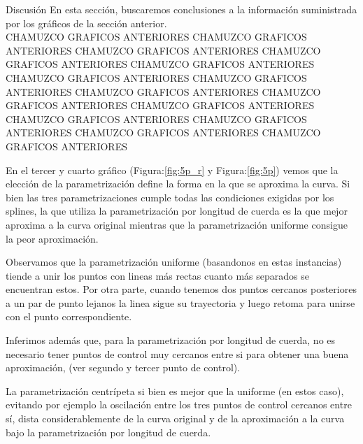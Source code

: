 \begin{section}{Discusión}
	En esta sección, buscaremos conclusiones a la información suministrada por los gráficos de la sección anterior.\\
	
	CHAMUZCO GRAFICOS ANTERIORES	CHAMUZCO GRAFICOS ANTERIORES	CHAMUZCO GRAFICOS ANTERIORES	CHAMUZCO GRAFICOS ANTERIORES	CHAMUZCO GRAFICOS ANTERIORES	CHAMUZCO GRAFICOS ANTERIORES	CHAMUZCO GRAFICOS ANTERIORES	CHAMUZCO GRAFICOS ANTERIORES	CHAMUZCO GRAFICOS ANTERIORES	CHAMUZCO GRAFICOS ANTERIORES	CHAMUZCO GRAFICOS ANTERIORES	CHAMUZCO GRAFICOS ANTERIORES	CHAMUZCO GRAFICOS ANTERIORES	CHAMUZCO GRAFICOS ANTERIORES
	
	En el tercer y cuarto gráfico (Figura:\ref{fig:5p_r} y Figura:\ref{fig:5p}) vemos que la elección de la parametrización define la forma en la que se aproxima la curva. Si bien las tres parametrizaciones cumple todas las condiciones exigidas por los splines, la que utiliza la parametrización por longitud de cuerda es la que mejor aproxima a la curva original mientras que la parametrización uniforme consigue la peor aproximación.
	
	Observamos que la parametrización uniforme (basandonos en estas instancias) tiende a unir los puntos con lineas más rectas cuanto más separados se encuentran estos. Por otra parte, cuando tenemos dos puntos cercanos posteriores a un par de punto lejanos la linea sigue su trayectoria y luego retoma para unirse con el punto correspondiente.  
	
	
	
	Inferimos además que, para la parametrización por longitud de cuerda, no es necesario tener puntos de control muy cercanos entre si para obtener una buena aproximación, (ver segundo y tercer punto de control).
	
	La parametrización centrípeta si bien es mejor que la uniforme (en estos caso), evitando por ejemplo la oscilación entre los tres puntos de control cercanos entre sí, dista considerablemente de la curva original y de la aproximación a la curva bajo la parametrización por longitud de cuerda.\\
	

\end{section}
